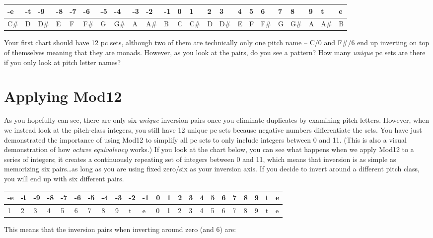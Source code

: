 \documentclass{book}
\begin{document}
\begin{longtable}[]{@{}lllllllllllllllllllllll@{}}
\toprule
-e & -t & -9 & -8 & -7 & -6 & -5 & -4 & -3 & -2 & -1 & 0 & 1 & 2 & 3 & 4 & 5 &
6 & 7 & 8 & 9 & t & e \\
\midrule
\endhead
C\# & D & D\# & E & F & F\# & G & G\# & A & A\# & B & C & C\# & D & D\# & E &
F & F\# & G & G\# & A & A\# & B \\
\bottomrule
\end{longtable}

Your first chart should have 12 pc sets, although two of them are technically
only one pitch name -- C/0 and F\#/6 end up inverting on top of themselves
meaning that they are monads. However, as you look at the pairs, do you see a
pattern? How many \emph{unique} pc sets are there if you only look at pitch
letter names?

\hypertarget{applying-mod12}{%
\section{Applying Mod12}\label{applying-mod12}}

As you hopefully can see, there are only six \emph{unique} inversion pairs
once you eliminate duplicates by examining pitch letters. However, when we
instead look at the pitch-class integers, you still have 12 unique pc sets
because negative numbers differentiate the sets. You have just demonstrated
the importance of using Mod12 to simplify all pc sets to only include integers
between 0 and 11. (This is also a visual demonstration of how \emph{octave
equivalency} works.) If you look at the chart below, you can see what happens
when we apply Mod12 to a series of integers; it creates a continuously
repeating set of integers between 0 and 11, which means that inversion is as
simple as memorizing six pairs\ldots as long as you are using fixed zero/six
as your inversion axis. If you decide to invert around a different pitch
class, you will end up with six different pairs.

\begin{longtable}[]{@{}lllllllllllllllllllllll@{}}
\toprule
-e & -t & -9 & -8 & -7 & -6 & -5 & -4 & -3 & -2 & -1 & 0 & 1 & 2 & 3 & 4 & 5 &
6 & 7 & 8 & 9 & t & e \\
\midrule
\endhead
1 & 2 & 3 & 4 & 5 & 6 & 7 & 8 & 9 & t & e & 0 & 1 & 2 & 3 & 4 & 5 & 6 & 7 & 8
& 9 & t & e \\
\bottomrule
\end{longtable}

This means that the inversion pairs when inverting around zero (and 6) are:
\end{document}
